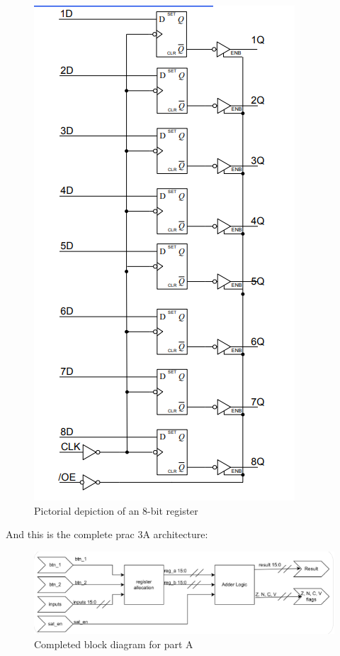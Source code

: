 \documentclass[12pt,a4paper]{article}
\begin{document}
\begin{figure}[H]
    \centering
    \includegraphics[scale=0.25]{images/register.png}
    \caption{Pictorial depiction of an 8-bit register}
    \label{fig:register}
\end{figure}

And this is the complete prac 3A architecture:

\begin{figure}[H]
    \centering
    \includegraphics[scale=0.5]{images/block_diagram_a.png}
    \caption{Completed block diagram for part A}
    \label{fig:block_a}
\end{figure}
\end{document}
